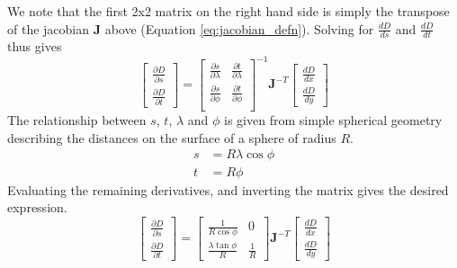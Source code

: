 \documentclass[a4paper,10pt]{article}
\begin{document}
We note that the first 2x2 matrix on the right hand side is simply the transpose of the jacobian $\mathbf{J}$ above (Equation \eqref{eq:jacobian_defn}). Solving for  $\frac{dD}{ds}$ and $\frac{dD}{dt}$ thus gives
\begin{equation}
\left[\begin{matrix} 
         \frac {\partial D}{\partial s}  \\
         \frac {\partial D}{\partial t}  
        \end{matrix}\right]
= \left[\begin{matrix} 
         \frac {\partial s}{\partial \lambda}  & \frac {\partial t}{\partial \lambda} \\
         \frac {\partial s}{\partial \phi}  & \frac {\partial t}{\partial \phi} \\
        \end{matrix}\right]^{-1}
\mathbf{J}^{-T}
\left[\begin{matrix} 
	  \frac{dD}{dx} \\ 
	  \frac{dD}{dy} 
	  \end{matrix}\right] 
\end{equation}
The relationship between $s$, $t$, $\lambda$ and $\phi$ is given from simple spherical geometry describing the distances on the surface of a sphere of radius $R$.
\begin{subequations}\begin{align}
s&=R\lambda\cos\phi \\t&=R\phi
\end{align}\end{subequations}
Evaluating the remaining derivatives, and inverting the matrix gives the desired expression.
\begin{equation}
\left[\begin{matrix} 
         \frac {\partial D}{\partial s}  \\
         \frac {\partial D}{\partial t}  
        \end{matrix}\right]
= \left[\begin{matrix} 
         \frac {1}{R \cos \phi}  & 0 \\
         \frac {\lambda \tan \phi}{R}  & \frac {1}{R}
        \end{matrix}\right]
\mathbf{J}^{-T}
\left[\begin{matrix} 
	  \frac{dD}{dx} \\ 
	  \frac{dD}{dy} 
	  \end{matrix}\right] 
\end{equation}
\end{document}
